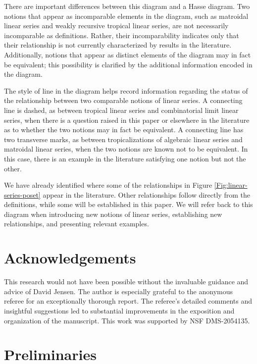 \documentclass{amsart}
\begin{document}
	There are important differences between this diagram and a Hasse diagram. Two notions that appear as incomparable elements in the diagram, such as matroidal linear series and weakly recursive tropical linear series, are not necessarily incomparable as definitions. Rather, their incomparability indicates only that their relationship is not currently characterized by results in the literature. Additionally, notions that appear as distinct elements of the diagram may in fact be equivalent; this possibility is clarified by the additional information encoded in the diagram.
	
	The style of line in the diagram helps record information regarding the status of the relationship between two comparable notions of linear series. A connecting line is dashed, as between tropical linear series and combinatorial limit linear series, when there is a question raised in this paper or elsewhere in the literature as to whether the two notions may in fact be equivalent. A connecting line has two transverse marks, as between tropicalizations of algebraic linear series and matroidal linear series, when the two notions are known not to be equivalent. In this case, there is an example in the literature satisfying one notion but not the other.
	
	We have already identified where some of the relationships in Figure \ref{Fig:linear-series-poset} appear in the literature. Other relationships follow directly from the definitions, while some will be established in this paper. We will refer back to this diagram when introducing new notions of linear series, establishing new relationships, and presenting relevant examples.
	
	\section*{Acknowledgements} This research would not have been possible without the invaluable guidance and advice of David Jensen. The author is especially grateful to the anonymous referee for an exceptionally thorough report. The referee's detailed comments and insightful suggestions led to substantial improvements in the exposition and organization of the manuscript. This work was supported by NSF DMS-2054135.
	
	\section{Preliminaries}
	\label{Sec:Prelim}
	
\end{document}
